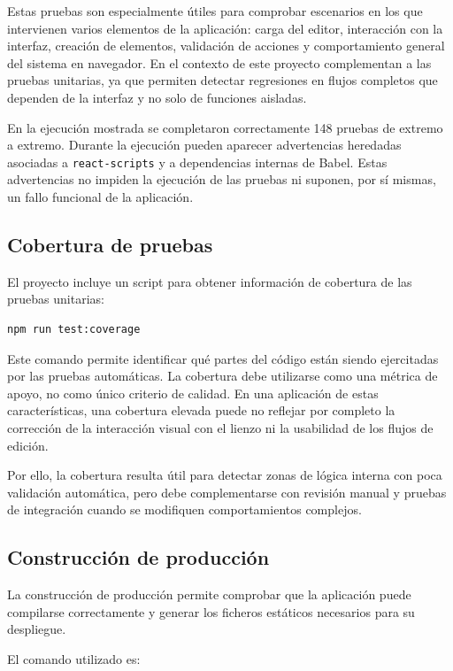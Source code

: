 Estas pruebas son especialmente útiles para comprobar escenarios en los que intervienen varios elementos de la aplicación: carga del editor, interacción con la interfaz, creación de elementos, validación de acciones y comportamiento general del sistema en navegador. En el contexto de este proyecto complementan a las pruebas unitarias, ya que permiten detectar regresiones en flujos completos que dependen de la interfaz y no solo de funciones aisladas.

En la ejecución mostrada se completaron correctamente 148 pruebas de extremo a extremo. Durante la ejecución pueden aparecer advertencias heredadas asociadas a \texttt{react-scripts} y a dependencias internas de Babel. Estas advertencias no impiden la ejecución de las pruebas ni suponen, por sí mismas, un fallo funcional de la aplicación.


\subsection{Cobertura de pruebas}

El proyecto incluye un script para obtener información de cobertura de las pruebas unitarias:

\begin{verbatim}
npm run test:coverage
\end{verbatim}

Este comando permite identificar qué partes del código están siendo ejercitadas por las pruebas automáticas. La cobertura debe utilizarse como una métrica de apoyo, no como único criterio de calidad. En una aplicación de estas características, una cobertura elevada puede no reflejar por completo la corrección de la interacción visual con el lienzo ni la usabilidad de los flujos de edición.

Por ello, la cobertura resulta útil para detectar zonas de lógica interna con poca validación automática, pero debe complementarse con revisión manual y pruebas de integración cuando se modifiquen comportamientos complejos.

\subsection{Construcción de producción}

La construcción de producción permite comprobar que la aplicación puede compilarse correctamente y generar los ficheros estáticos necesarios para su despliegue.

El comando utilizado es:

